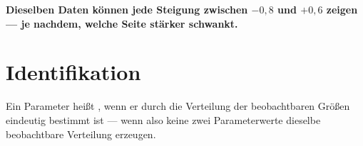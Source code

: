 \begin{merksatz}
\begin{center}
\begin{minipage}{0.9\textwidth}
\textbf{Dieselben Daten können jede Steigung zwischen $-0{,}8$ und $+0{,}6$ zeigen --- je nachdem, welche Seite stärker schwankt.}
\end{minipage}
\end{center}

\begin{center}
\begin{minipage}{0.88\textwidth}
\end{minipage}
\end{center}
\end{merksatz}

\section{Identifikation}

\begin{definition}
Ein Parameter heißt , wenn er durch die Verteilung der beobachtbaren Größen eindeutig bestimmt ist --- wenn also keine zwei Parameterwerte dieselbe beobachtbare Verteilung erzeugen.
\end{definition}

